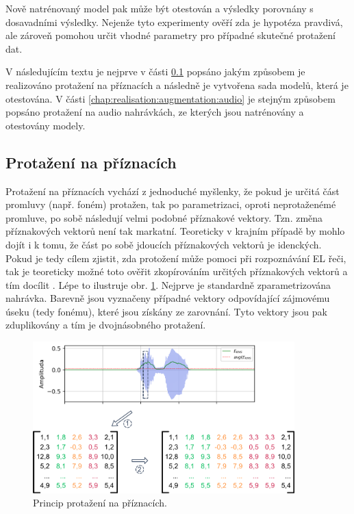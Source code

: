 \noindent Nově natrénovaný model pak může být otestován a výsledky porovnány s dosavadními výsledky. Nejenže tyto experimenty ověří zda je hypotéza pravdivá, ale zároveň pomohou určit vhodné parametry pro případné skutečné protažení dat.

V následujícím textu je nejprve v části \ref{chap:realisation:augmentation:features} popsáno jakým způsobem je realizováno protažení na příznacích a následně je vytvořena sada modelů, která je otestována. V části \ref{chap:realisation:augmentation:audio} je stejným způsobem popsáno protažení na audio nahrávkách, ze kterých jsou natrénovány a otestovány modely.

\subsection{Protažení na příznacích}
\label{chap:realisation:augmentation:features}

Protažení na příznacích vychází z jednoduché myšlenky, že pokud je určitá část promluvy (např. foném) protažen, tak po parametrizaci, oproti neprotaženémé promluve, po sobě následují velmi podobné příznakové vektory. Tzn. změna příznakových vektorů není tak markatní. Teoreticky v krajním případě by mohlo dojít i k tomu, že část po sobě jdoucích příznakových vektorů je idenckých. Pokud je tedy cílem zjistit, zda protožení může pomoci při rozpoznávání EL řeči, tak je teoreticky možné toto ověřit zkopírováním určitých příznakových vektorů a tím docílit . Lépe to ilustruje obr. \ref{fig:experiments:augmentation:features}. Nejprve je standardně zparametrizována nahrávka. Barevně jsou vyznačeny případné vektory odpovídající zájmovému úseku (tedy fonému), které jsou získány ze zarovnání. Tyto vektory jsou pak zduplikovány a tím je  dvojnásobného protažení.

\begin{figure}[hbpt]
  \centering
  \includegraphics[width=0.9\textwidth]{./ch5-construction/img/augmentation_features.pdf}
  \caption{Princip protažení na příznacích.}
  \label{fig:experiments:augmentation:features}
\end{figure}

